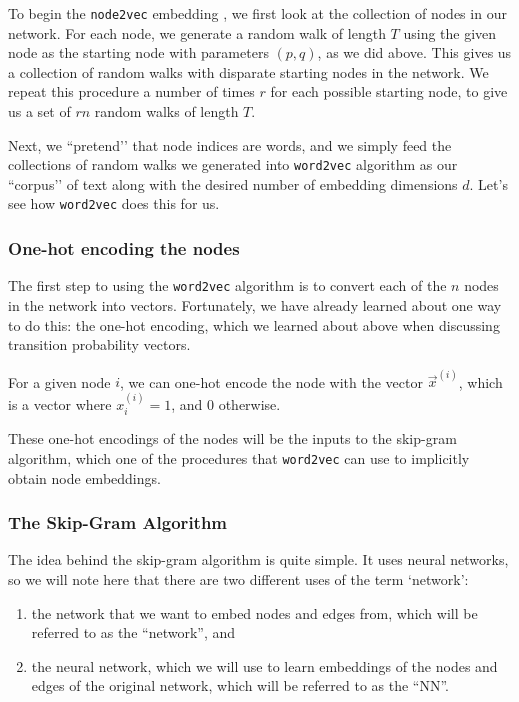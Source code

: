 To begin the \texttt{node2vec} embedding \cite{Grover2016Aug}, we first look at the collection of nodes in our network. For each node, we generate a random walk of length $T$ using the given node as the starting node with parameters $(p,q)$, as we did above. This gives us a collection of random walks with disparate starting nodes in the network. We repeat this procedure a number of times $r$ for each possible starting node, to give us a set of $rn$ random walks of length $T$. 

Next, we ``pretend’’ that node indices are words, and we simply feed the collections of random walks we generated into \texttt{word2vec} algorithm as our ``corpus’’ of text along with the desired number of embedding dimensions $d$. Let's see how \texttt{word2vec} does this for us.

\subsubsection*{One-hot encoding the nodes}

The first step to using the \texttt{word2vec} algorithm is to convert each of the $n$ nodes in the network into vectors. Fortunately, we have already learned about one way to do this: the one-hot encoding, which we learned about above when discussing transition probability vectors. 

For a given node $i$, we can one-hot encode the node with the vector $\vec x^{(i)}$, which is a vector where $x^{(i)}_i = 1$, and $0$ otherwise. 

These one-hot encodings of the nodes will be the inputs to the skip-gram algorithm, which one of the procedures that \texttt{word2vec} can use to implicitly obtain node embeddings.

\subsubsection*{The Skip-Gram Algorithm}

The idea behind the skip-gram algorithm is quite simple. It uses neural networks, so we will note here that there are two different uses of the term `network': 

\begin{enumerate}
    \item the network that we want to embed nodes and edges from, which will be referred to as the ``network'', and
    \item the neural network, which we will use to learn embeddings of the nodes and edges of the original network, which will be referred to as the ``NN''.
\end{enumerate}

